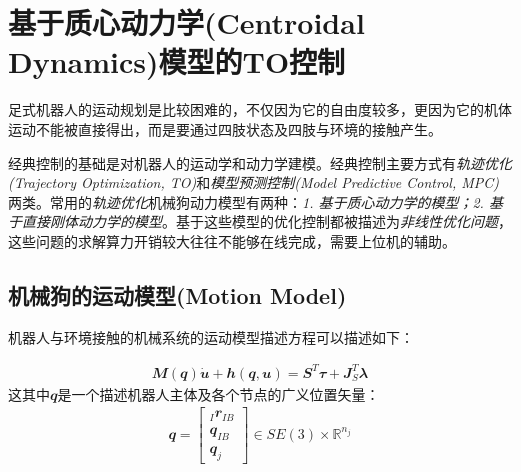 
\chapter[基于质心动力学(Centroidal Dynamics)模型的TO控制]{基于质心动力学(Centroidal Dynamics)模型的TO控制}

足式机器人的运动规划是比较困难的，不仅因为它的自由度较多，更因为它的机体运动不能被直接得出，而是要通过四肢状态及四肢与环境的接触产生。

经典控制的基础是对机器人的运动学和动力学建模。经典控制主要方式有\emph{轨迹优化(Trajectory Optimization, TO)}和\emph{模型预测控制(Model Predictive Control, MPC)}两类。常用的\emph{轨迹优化}机械狗动力模型有两种\cite[p2]{Winkler_Bellicoso_Hutter_Buchli_2018}：\emph{1. 基于质心动力学的模型；2. 基于直接刚体动力学的模型}。基于这些模型的优化控制都被描述为\emph{非线性优化问题}，这些问题的求解算力开销较大往往不能够在线完成，需要上位机的辅助。





\section[机械狗的运动模型(Motion Model)]{\label{section:motion_model}机械狗的运动模型(Motion Model)\cite[p2]{Bellicoso_Jenelten_Fankhauser_Gehring_Hwangbo_Hutter_2017, Bellicoso_Jenelten_Gehring_Hutter_2018}}

机器人与环境接触的机械系统的运动模型描述方程可以描述如下：

\begin{align}
    {\mathbfit M}({\mathbfit q})\dot{\mathbfit u} + {\mathbfit h}({\mathbfit q}, {\mathbfit u}) =  {\mathbfit S}^T{\mathbfit \tau} + {\mathbfit J}_S^T {\mathbfit \lambda}
\end{align}
这其中${\mathbfit q}$是一个描述机器人主体及各个节点的广义位置矢量：
\begin{align}
    {\mathbfit q}= \begin{bmatrix}_I {\mathbfit r}_{IB} \\ {\mathbfit q}_{IB} \\ {\mathbfit q}_j\end{bmatrix} \in SE(3)\times {\mathbb R}^{n_j}
\end{align}

